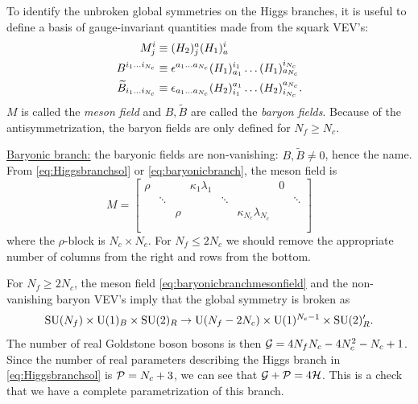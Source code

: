             To identify the unbroken global symmetries on the Higgs branches, it is useful to define a basis of gauge-invariant quantities made from the squark VEV's:
            \begin{align}
                M^i_j &\equiv (H_2)^a_j(H_1)^i_a\\
                B^{i_1\dots i_{N_c}} &\equiv \epsilon^{a_1\dots a_{N_c}}(H_1)^{i_1}_{a_1}\dots(H_1)^{i_{N_c}}_{a_{N_c}}\\
                \widetilde{B}_{i_1\dots i_{N_c}} &\equiv \epsilon_{a_1\dots a_{N_c}}(H_2)^{a_1}_{i_1}\dots(H_2)^{a_{N_c}}_{i_{N_c}}.
            \end{align}
            $M$ is called the \emph{meson field} and $B,\tilde{B}$ are called the \emph{baryon fields}. Because of the antisymmetrization, the baryon fields are only defined for $N_f\geq N_c$.

            \underline{Baryonic branch:} the baryonic fields are non-vanishing: $B,\tilde{B}\neq0$, hence the name. From \eqref{eq:Higgsbranchsol} or \eqref{eq:baryonicbranch}, the meson field is
            \begin{equation}
                M=
                \begin{bmatrix}
                    \rho & & & \kappa_1\lambda_1 & & & 0 & \\
                    & \ddots & & & \ddots & & & \ddots \\
                    & & \rho & & & \kappa_{N_c}\lambda_{N_c} & & \\
                    & & & & & & & \\
                    & & & & & & &
                \end{bmatrix}\label{eq:baryonicbranchmesonfield}
            \end{equation}
            where the $\rho$-block is $N_c\times N_c$. For $N_f\leq 2N_c$ we should remove the appropriate number of columns from the right and rows from the bottom.
            
            For $N_f\geq 2N_c$, the meson field \eqref{eq:baryonicbranchmesonfield} and the non-vanishing baryon VEV's imply that the global symmetry is broken as
            \begin{equation}
                \text{SU}(N_f)\times\text{U}(1)_B\times\text{SU}(2)_R\to\text{U}(N_f-2N_c)\times\text{U}(1)^{N_c-1}\times\text{SU}(2)'_R.
            \end{equation}
            The number of real Goldstone boson bosons is then $\mathcal{G}=4N_fN_c-4N^2_c-N_c+1$. Since the number of real parameters describing the Higgs branch in \eqref{eq:Higgsbranchsol} is $\mathcal{P}=N_c+3$, we can see that $\mathcal{G}+\mathcal{P}=4\mathcal{H}$. This is a check that we have a complete parametrization of this branch.

